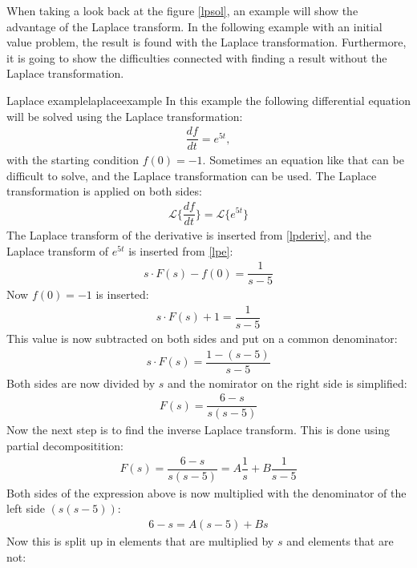 When taking a look back at the figure \ref{lpsol}, an example will show the advantage of the Laplace transform. In the following example with an initial value problem, the result is found with the Laplace transformation. Furthermore, it is going to show the difficulties connected with finding a result without the Laplace transformation.
\begin{example}{Laplace example}{laplaceexample}
In this example the following differential equation will be solved using the Laplace transformation:
\begin{align}
\dfrac{df}{dt}=e^{5t}, 	
\end{align} \label{inieq}
with the starting condition $f(0)=-1$. Sometimes an equation like that can be difficult to solve, and the Laplace transformation can be used. The Laplace transformation is applied on both sides:
\begin{align*}
\mathcal{L} \{\dfrac{df}{dt} \}= \mathcal{L} \{e^{5t} \}
\end{align*}
The Laplace transform of the derivative is inserted from \ref{lpderiv}, and the Laplace transform of $e^{5t}$ is inserted from \ref{lpe}:
\begin{align*}
s \cdot F(s) - f(0) = \dfrac{1}{s-5}
\end{align*}
Now $f(0)=-1$ is inserted:
\begin{align*}
s \cdot F(s) + 1 = \dfrac{1}{s-5}
\end{align*}
This value is now subtracted on both sides and put on a common denominator:
\begin{align*}
s \cdot F(s) = \dfrac{1-(s-5)}{s-5}
\end{align*}
Both sides are now divided by $s$ and the nomirator on the right side is simplified:
\begin{align*}
F(s) = \dfrac{6-s}{s(s-5)}
\end{align*}
Now the next step is to find the inverse Laplace transform. This is done using partial decompositition: \cite[p. 537]{calc}
\begin{align}
F(s) = \dfrac{6-s}{s(s-5)} = A \dfrac{1}{s} + B \dfrac{1}{s-5}
\label{par_dec}
\end{align}
Both sides of the expression above is now multiplied with the denominator of the left side $(s(s-5))$:
\begin{align*}
6 - s = A(s-5) + Bs
\end{align*}
Now this is split up in elements that are multiplied by $s$ and elements that are not:
\begin{align*}

\end{align*}
\end{example}
